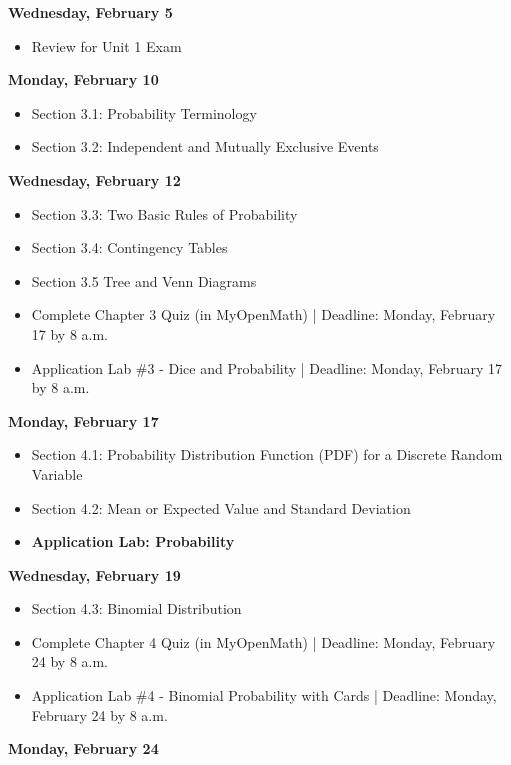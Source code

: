 \documentclass[11pt]{article}
\begin{document}
\textbf{Wednesday, February 5}

\begin{itemize}
\item Review for Unit 1 Exam
\end{itemize}

\textbf{Monday, February 10}

\begin{itemize}
\item Section 3.1: Probability Terminology
\item Section 3.2: Independent and Mutually Exclusive Events
\end{itemize}

\textbf{Wednesday, February 12}

\begin{itemize}
\item Section 3.3: Two Basic Rules of Probability
\item Section 3.4: Contingency Tables
\item Section 3.5 Tree and Venn Diagrams
\item Complete Chapter 3 Quiz (in MyOpenMath) | Deadline: Monday, February 17 by 8 a.m.
\item Application Lab \#3 - Dice and Probability | Deadline: Monday, February 17 by 8 a.m.
\end{itemize}

\textbf{Monday, February 17}

\begin{itemize}
\item Section 4.1: Probability Distribution Function (PDF) for a Discrete Random Variable
\item Section 4.2: Mean or Expected Value and Standard Deviation
\item \textbf{Application Lab: Probability}
\end{itemize}

\textbf{Wednesday, February 19}

\begin{itemize}
\item Section 4.3: Binomial Distribution
\item Complete Chapter 4 Quiz (in MyOpenMath) | Deadline: Monday, February 24 by 8 a.m.
\item Application Lab \#4 - Binomial Probability with Cards | Deadline: Monday, February 24 by 8 a.m.
\end{itemize}

\textbf{Monday, February 24}
\end{document}

